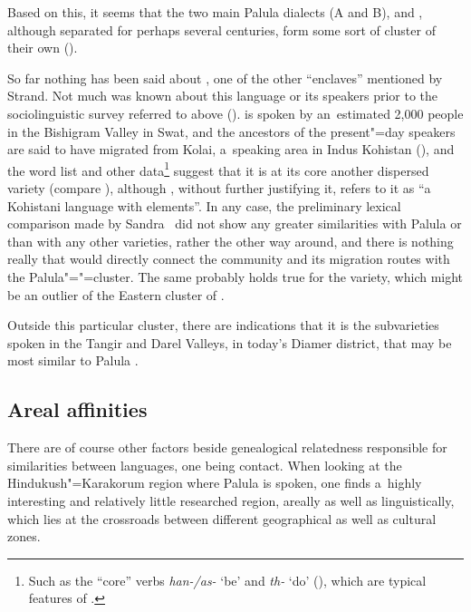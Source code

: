  
Based on this, it seems that the two main Palula dialects (A and B), \iliSauji and \iliKalkoti, although separated for perhaps several centuries, form some sort of cluster of their own (\citealt{liljegren2009}).

\largerpage[-1]
So far nothing has been said about \iliUshojo, one of the other ``enclaves'' mentioned by Strand. Not much was known about this language or its speakers prior to the sociolinguistic survey referred to above (\citealt{decker1992}). \iliUshojo is spoken by an~estimated 2,000 people in the Bishigram Valley in Swat, and the ancestors of the present"=day speakers are said to have migrated from Kolai, a~\iliShina speaking area in Indus Kohistan (\citealt[69]{decker1992}), and the word list and other data\footnote{Such as the ``core'' verbs \textit{han-/as-} `be' and \textit{th-} `do' (\citealt[ 71--72, 199--203]{decker1992}), which are typical features of \iliShina.} suggest that it is at its core another dispersed \iliShina variety (compare \citealt[255]{strand2001}), although \citet[9]{zoller2005}, without further justifying it, refers to it as ``a Kohistani language with \iliShina elements''. In any case, the preliminary lexical comparison made by Sandra~\citet[70]{decker1992} did not show any greater similarities with Palula or \iliKalkoti than with any other \iliShina varieties, rather the other way around, and there is nothing really that would directly connect the \iliUshojo community and its migration routes with the Palula"=\iliSauji"=\iliKalkoti cluster. The same probably holds true for the \iliKundalShahi variety, which might be an outlier of the Eastern cluster of \iliShina \citep[9]{baartrehman2005}.


Outside this particular cluster, there are indications that it is the \iliShina subvarieties spoken in the Tangir and Darel Valleys, in today's Diamer district, that may be most similar to Palula \citep[142--143]{radloff1992}. 


\subsection{Areal affinities}
\label{subsec:1-3-2}

There are of course other factors beside genealogical relatedness responsible for similarities between languages, one being contact. When looking at the Hindukush"=Karakorum region where Palula is spoken, one finds a~highly interesting and relatively little researched region, areally as well as linguistically, which lies at the crossroads between different geographical as well as cultural zones. 

